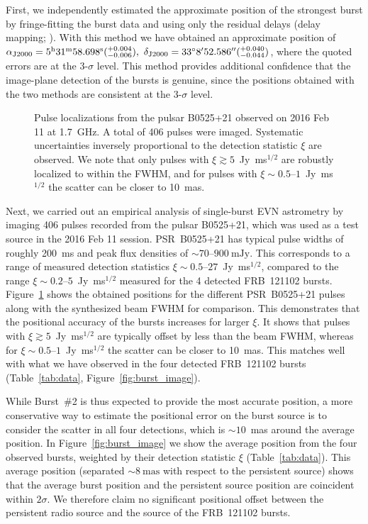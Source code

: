 \documentclass[twocolumn]{aastex61}
\newcommand{\frb}{FRB~121102\xspace}
\begin{document}
First, we independently estimated the approximate position of the strongest burst by fringe-fitting the burst data and using only the residual delays (delay mapping; \citealt[in prep.]{huang2017}). With this method we have obtained an approximate position of $\alpha_{\rm J2000} = 5^{\rm h}31^{\rm m}58.698^{\rm s} (_{-0.006}^{+0.004}),\  \delta_{\rm J2000} = 33^{\circ}8^{\prime}52.586^{\prime\prime} (_{-0.044}^{+0.040})$, where the quoted errors are at the 3-$\sigma$ level. This method provides additional confidence that the image-plane detection of the bursts is genuine, since the positions obtained with the two methods are consistent at the 3-$\sigma$ level.

\begin{figure}[ht!]
	\caption{Pulse localizations from the pulsar B0525+21 observed on 2016 Feb 11 at 1.7~GHz. A total of 406 pulses were imaged.  Systematic uncertainties inversely proportional to the detection statistic $\xi$ are observed. We note that only pulses with $\xi \gtrsim 5$~Jy~ms$^{1/2}$ are robustly localized to within the FWHM, and for pulses with $\xi \sim 0.5$--$1$~Jy~ms$^{1/2}$ the scatter can be closer to 10~mas.
	\label{fig:test_source}}
\end{figure}

Next, we carried out an empirical analysis of single-burst EVN astrometry by imaging 406 pulses recorded from the pulsar B0525+21, which was used as a test source in the 2016 Feb 11 session.  PSR~B0525+21 has typical pulse widths of roughly 200~ms and peak flux densities of $\sim 70$--$900~\mathrm{mJy}$.  This corresponds to a range of measured detection statistics $\xi \sim 0.5$--$27$~Jy~ms$^{1/2}$, compared to the range $\xi \sim 0.2$--$5$~Jy~ms$^{1/2}$ measured for the 4 detected \frb bursts.  Figure~\ref{fig:test_source} shows the obtained positions for the different PSR~B0525+21 pulses along with the synthesized beam FWHM for comparison.  This demonstrates that the positional accuracy of the bursts increases for larger $\xi$.  It shows that pulses with $\xi \gtrsim 5$~Jy~ms$^{1/2}$ are typically offset by less than the beam FWHM, whereas for $\xi \sim 0.5$--$1$~Jy~ms$^{1/2}$ the scatter can be closer to 10~mas.  This matches well with what we have observed in the four detected \frb bursts (Table~\ref{tab:data}, Figure~\ref{fig:burst_image}).

While Burst~\#2 is thus expected to provide the most accurate position, a more conservative way to estimate the positional error on the burst source is to consider the scatter in all four detections, which is $\sim 10$~mas around the average position.  In Figure~\ref{fig:burst_image} we show the average position from the four observed bursts, weighted by their detection statistic $\xi$ (Table~\ref{tab:data}). This average position (separated $\sim 8~\mathrm{mas}$ with respect to the persistent source) shows that the average burst position and the persistent source position are coincident within $2\sigma$.  We therefore claim no significant positional offset between the persistent radio source and the source of the \frb bursts.
\end{document}
